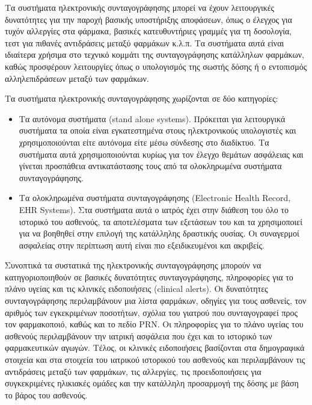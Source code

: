 		
		Τα συστήματα ηλεκτρονικής συνταγογράφησης μπορεί να έχουν λειτουργικές δυνατότητες για την παροχή βασικής υποστήριξης αποφάσεων, όπως ο έλεγχος για τυχόν αλλεργίες στα φάρμακα, βασικές κατευθυντήριες γραμμές για τη δοσολογία, τεστ για πιθανές αντιδράσεις μεταξύ φαρμάκων κ.λ.π. Τα συστήματα αυτά είναι ιδιαίτερα χρήσιμα στο τεχνικό κομμάτι της συνταγογράφησης κατάλληλων φαρμάκων, καθώς προσφέρουν λειτουργίες όπως ο υπολογισμός της σωστής δόσης ή ο εντοπισμός αλληλεπιδράσεων μεταξύ των φαρμάκων. \cite{Kart2008}

		Τα συστήματα ηλεκτρονικής συνταγογράφησης χωρίζονται σε δύο κατηγορίες:
		
		\begin{itemize}
		
		\item Τα αυτόνομα συστήματα (stand alone systems). Πρόκειται για λειτουργικά συστήματα τα οποία είναι εγκατεστημένα στους ηλεκτρονικούς υπολογιστές  και χρησιμοποιούνται είτε αυτόνομα είτε μέσω σύνδεσης στο διαδίκτυο.  Τα συστήματα αυτά χρησιμοποιούνται κυρίως για τον έλεγχο θεμάτων ασφάλειας και γίνεται προσπάθεια αντικατάστασης τους από τα ολοκληρωμένα συστήματα συνταγογράφησης.

		\item Τα ολοκληρωμένα συστήματα συνταγογράφησης (Electronic Health Record, EHR Systems). Στα συστήματα αυτά ο ιατρός έχει στην διάθεση του όλο το ιστορικό του ασθενούς, τα αποτελέσματα των εξετάσεων του και τα χρησιμοποιεί για να βοηθηθεί στην επιλογή της κατάλληλης δραστικής ουσίας. Οι συναγερμοί ασφαλείας στην περίπτωση αυτή είναι πιο εξειδικευμένοι και ακριβείς.  

		\end{itemize}
		

		Συνοπτικά τα συστατικά της ηλεκτρονικής συνταγογράφησης μπορούν να κατηγοριοποιηθούν σε βασικές δυνατότητες συνταγογράφησης, πληροφορίες για το πλάνο υγείας και τις κλινικές ειδοποιήσεις (clinical alerts).  Οι δυνατότητες συνταγογράφησης περιλαμβάνουν μια λίστα φαρμάκων, οδηγίες για τους ασθενείς, τον αριθμός των εγκεκριμένων ποσοτήτων, σχόλια του γιατρού που συνταγογραφεί προς τον φαρμακοποιό, καθώς και το πεδίο PRN. Οι πληροφορίες για το πλάνο υγείας του ασθενούς περιλαμβάνουν την ιατρική ασφάλεια που έχει και το ιστορικό των φαρμακευτικών αγωγών. Τέλος, οι κλινικές ειδοποιήσεις  βασίζονται στα δημογραφικά στοιχεία και στα στοιχεία του ιατρικού ιστορικού του ασθενούς και περιλαμβάνουν τις αντιδράσεις μεταξύ των φαρμάκων, τις αλλεργίες, τις προειδοποιήσεις για συγκεκριμένες ηλικιακές ομάδες και την κατάλληλη προσαρμογή της δόσης με βάση το βάρος του ασθενούς. \cite{prescribing} 
		
